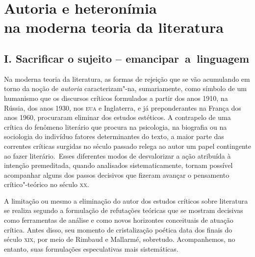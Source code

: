 






\chapter*{Autoria e heteronímia\\ na moderna teoria da literatura}

\section*{I. Sacrificar o sujeito -- emancipar~a~linguagem}


Na moderna teoria da literatura, as formas de rejeição que se vão
acumulando em torno da noção de \emph{autoria} caracterizam"-na,
sumariamente, como símbolo de um humanismo que os discursos críticos
formulados a partir dos anos 1910, na Rússia, dos anos 1930, nos
\textsc{eua} e Inglaterra, e já preponderantes na França dos anos 1960,
procuraram eliminar dos estudos estéticos. A contrapelo de uma crítica
do fenômeno literário que procura na psicologia, na biografia ou na
sociologia do indivíduo fatores determinantes do texto, a maior parte
das correntes críticas surgidas no século passado relega ao autor um
papel contingente ao fazer literário.~Esses diferentes modos de
desvalorizar a ação atribuída à intenção premeditada, quando analisados
sistematicamente, tornam possível acompanhar alguns dos passos decisivos
que fizeram avançar o pensamento crítico"-teórico no século \textsc{xx}.

A limitação ou mesmo a eliminação do autor dos estudos críticos sobre
literatura se realiza segundo a formulação de refutações teóricas que se
mostram decisivas como ferramentas de análise e como novos horizontes
conceituais de atuação crítica. Antes disso, seu momento de
cristalização poética data dos finais do século \textsc{xix}, por meio
de Rimbaud e Mallarmé, sobretudo. Acompanhemos, no entanto, suas
formulações especulativas mais sistemáticas.

